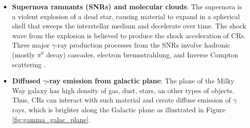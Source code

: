 \begin{itemize}
    \item \textbf{Supernova ramnants (SNRs) and molecular clouds}: 
    The supernova is a violent explosion of a dead star,
    causing material to expand in a spherical shell that sweeps
    the interstellar medium and decelerate over time.
    The shock wave from the explosion is believed to produce the
    shock acceleration of CRs.
    Three major $\gamma$-ray production processes from the SNRs
    involve hadronic (mostly $\pi^0$ decay) cascades, electron
    bremsstrahlung, and Inverse Compton scattering
    \citep{cr_from_snr_2013}.

    \item \textbf{Diffused $\gamma$-ray emission from galactic plane}:
    The plane of the Milky Way galaxy has high density of gas,
    dust, stars, an other types of objects.
    Thus, CRs can interact with such material and create diffuse
    emission of $\gamma$ rays, which is brighter along the
    Galactic plane as illustrated in Figure \ref{fig:gamma_galac_plane}.


\end{itemize}
